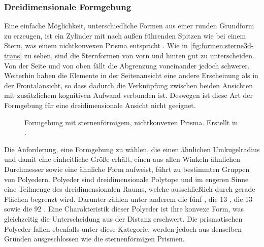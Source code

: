 \subsubsection{Dreidimensionale Formgebung}\label{sec:grundlagen:3Dformgebung}
Eine einfache Möglichkeit, unterschiedliche Formen aus einer runden Grundform zu erzeugen, ist ein Zylinder mit nach außen führenden Spitzen wie bei einem Stern, was einem nichtkonvexen Prisma entspricht \cite{UniformPolyhedra}. Wie in \autoref{fig:formen:sterne3d-trans} zu sehen, sind die Sternformen von vorn und hinten gut zu unterscheiden. Von der Seite und von oben fällt die Abgrenzung voneinander jedoch schwerer. Weiterhin haben die Elemente in der Seitenansicht eine andere Erscheinung als in der Frontalansicht, so dass dadurch die Verknüpfung zwischen beiden Ansichten mit zusätzlichem kognitiven Aufwand verbunden ist. Deswegen ist diese Art der Formgebung für eine dreidimensionale Ansicht nicht geeignet.

\begin{figure}
	{\caption{Formgebung mit sternenförmigem, nichtkonvexen Prisma. Erstellt in .}\label{fig:formen:sterne3d-trans}}
\end{figure}

Die Anforderung, eine Formgebung zu wählen, die einen ähnlichen Umkugelradius und damit eine einheitliche Größe erhält, einen aus allen Winkeln ähnlichen Durchmesser sowie eine ähnliche Form aufweist, führt zu bestimmten Gruppen von Polyedern. Polyeder sind dreidimensionale Polytope und im engeren Sinne eine Teilmenge des dreidimensionalen Raums, welche ausschließlich durch gerade Flächen begrenzt wird. Darunter zählen unter anderem die fünf  \cite{RegularPolyhedra}, die 13 , die 13  sowie die 92  \cite{JohnsonPolyeder}. Eine Charakteristik dieser Polyeder ist ihre konvexe Form, was gleichzeitig die Unterscheidung aus der Distanz erschwert. Die prismatischen Polyeder fallen ebenfalls unter diese Kategorie, werden jedoch aus denselben Gründen ausgeschlossen wie die sternenförmigen Prismen.

